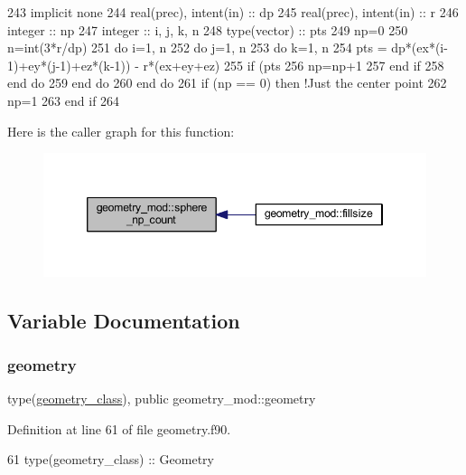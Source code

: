 \begin{DoxyCode}
243     \textcolor{keywordtype}{implicit none}
244     \textcolor{keywordtype}{real(prec)}, \textcolor{keywordtype}{intent(in)} :: dp
245     \textcolor{keywordtype}{real(prec)}, \textcolor{keywordtype}{intent(in)} :: r
246     \textcolor{keywordtype}{integer} :: np
247     \textcolor{keywordtype}{integer} :: i, j, k, n
248     \textcolor{keywordtype}{type}(vector) :: pts
249     np=0
250     n=int(3*r/dp)
251     \textcolor{keywordflow}{do} i=1, n
252         \textcolor{keywordflow}{do} j=1, n
253             \textcolor{keywordflow}{do} k=1, n
254                 pts = dp*(ex*(i-1)+ey*(j-1)+ez*(k-1)) - r*(ex+ey+ez)
255                 \textcolor{keywordflow}{if} (pts%
256                     np=np+1
257 \textcolor{keywordflow}{                end if}
258 \textcolor{keywordflow}{            end do}
259 \textcolor{keywordflow}{        end do}
260 \textcolor{keywordflow}{    end do}
261     \textcolor{keywordflow}{if} (np == 0) \textcolor{keywordflow}{then} \textcolor{comment}{!Just the center point}
262         np=1
263 \textcolor{keywordflow}{    end if}
264 
\end{DoxyCode}
Here is the caller graph for this function\+:\nopagebreak
\begin{figure}[H]
\begin{center}
\leavevmode
\includegraphics[width=346pt]{namespacegeometry__mod_a05de7940b4e7df5a2b31f3d0414e3743_icgraph}
\end{center}
\end{figure}


\subsection{Variable Documentation}
\mbox{\label{namespacegeometry__mod_ad2ad4f7e1138beaad5f37d5c15b7b457}} 
\subsubsection{\texorpdfstring{geometry}{geometry}}
{\footnotesize\ttfamily type(\mbox{\hyperlink{structgeometry__mod_1_1geometry__class}{geometry\+\_\+class}}), public geometry\+\_\+mod\+::geometry}



Definition at line 61 of file geometry.\+f90.


\begin{DoxyCode}
61     \textcolor{keywordtype}{type}(geometry\_class) :: Geometry
\end{DoxyCode}
